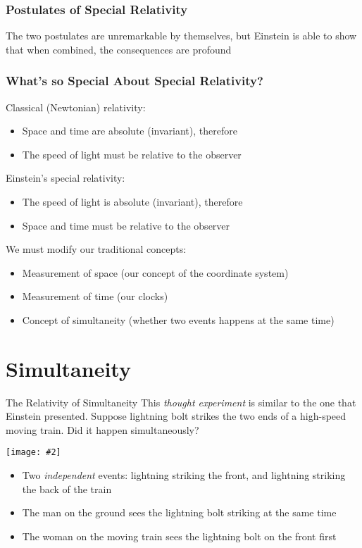 \documentclass[12pt,compress,aspectratio=169]{beamer}
\newcommand{\pic}[2]{\texttt{[image: \#2]}}
\begin{document}
\begin{frame}
  \frametitle{Postulates of Special Relativity}
  The two postulates are unremarkable by themselves, but Einstein is able to
  show that when combined, the consequences are profound
\end{frame}

\begin{frame}
  \frametitle{What's so Special About Special Relativity?}

  Classical (Newtonian) relativity:
  \begin{itemize}
  \item Space and time are absolute (invariant), therefore
  \item The speed of light must be relative to the observer
  \end{itemize}

  Einstein's special relativity:
  \begin{itemize}
  \item The speed of light is absolute (invariant), therefore
  \item Space and time must be relative to the observer
  \end{itemize}

  We must modify our traditional concepts:
  \begin{itemize}
  \item Measurement of space (our concept of the coordinate system)
  \item Measurement of time (our clocks)
  \item Concept of simultaneity (whether two events happens at the same time)
  \end{itemize}
\end{frame}

\section{Simultaneity}

\begin{frame}{The Relativity of Simultaneity}
  This \emph{thought experiment} is similar to the one that Einstein presented.
  Suppose lightning bolt strikes the two ends of a high-speed moving train. Did
  it happen simultaneously?
  \begin{center}
    \pic{.4}{graphics/87-1-1024x673.png}
  \end{center}

  \begin{itemize}
  \item\vspace{-.15in} Two \emph{independent} events: lightning striking the
    front, and lightning striking the back of the train
  \item The man on the ground sees the lightning bolt striking at the same time
  \item The woman on the moving train sees the lightning bolt on the front first
  \end{itemize}
\end{frame}
\end{document}
